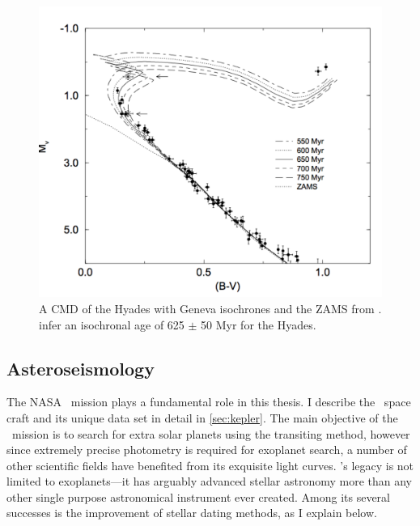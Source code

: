 \begin{figure}[p]
\begin{center}
\includegraphics[width=6in, clip=true]{figures/hyades.pdf}
\caption[A CMD of the Hyades.]
{A CMD of the Hyades with Geneva isochrones \citep{Schaller1992} and the ZAMS
from \citet{Perryman1998}.
\citet{Perryman1998} infer an isochronal age of 625 $\pm$ 50 Myr for the
Hyades.}
\label{fig:hyades}
\end{center}
\end{figure}


\subsection{Asteroseismology}
\label{sec:asteroseismology}

The NASA \kepler\ mission plays a fundamental role in this thesis.
I describe the \kepler\ space craft and its unique data set in detail in
\textsection \ref{sec:kepler}.
The main objective of the \kepler\ mission is to search for extra solar
planets using the transiting method, however since extremely precise
photometry is required for exoplanet search, a number of other scientific
fields have benefited from its exquisite light curves.
\kepler's legacy is not limited to exoplanets---it has arguably advanced
stellar astronomy more than any other single purpose astronomical instrument
ever created.
Among its several successes is the improvement of stellar dating methods, as
I explain below.

